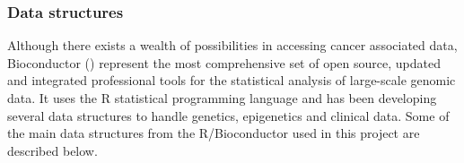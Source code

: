 
\subsubsection{Data structures}
Although there exists a wealth of possibilities \cite{kannan2015public}
in accessing cancer associated data, Bioconductor ()
represent the most comprehensive set of open source,
updated and integrated professional tools for the statistical analysis of large-scale genomic data.
It uses the R statistical programming language and has been developing several
data structures to handle genetics, epigenetics and clinical data.
Some of the main data structures from the R/Bioconductor used in this project are described below.

